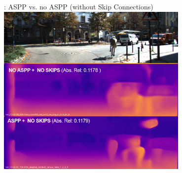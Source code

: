 \begin{frame}[c]{\subsecname: ASPP vs. no ASPP (without Skip Connections)}
\centering
\includegraphics[width=0.7\textwidth]{figures/images/skipsvsnoskips2_error.png}
\end{frame}




